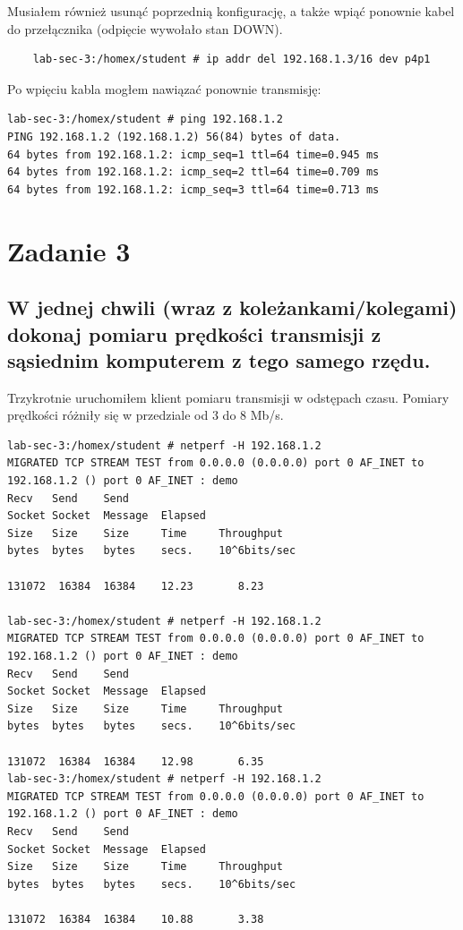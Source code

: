 \documentclass[polish, a4paper]{article}
\begin{document}
Musiałem również usunąć poprzednią konfigurację, a także wpiąć ponownie kabel do przełącznika (odpięcie wywołało stan DOWN).
\begin{verbatim}
    lab-sec-3:/homex/student # ip addr del 192.168.1.3/16 dev p4p1
\end{verbatim}

Po wpięciu kabla mogłem nawiązać ponownie transmisję:

\begin{verbatim}
lab-sec-3:/homex/student # ping 192.168.1.2
PING 192.168.1.2 (192.168.1.2) 56(84) bytes of data.
64 bytes from 192.168.1.2: icmp_seq=1 ttl=64 time=0.945 ms
64 bytes from 192.168.1.2: icmp_seq=2 ttl=64 time=0.709 ms
64 bytes from 192.168.1.2: icmp_seq=3 ttl=64 time=0.713 ms
\end{verbatim}


\section{Zadanie 3}
\subsection{W jednej chwili (wraz z koleżankami/kolegami) dokonaj
pomiaru prędkości transmisji z sąsiednim komputerem z tego
samego rzędu.}

Trzykrotnie uruchomiłem klient pomiaru transmisji w odstępach czasu. Pomiary prędkości różniły się w przedziale od 3 do 8 Mb/s.  

\begin{verbatim}
lab-sec-3:/homex/student # netperf -H 192.168.1.2
MIGRATED TCP STREAM TEST from 0.0.0.0 (0.0.0.0) port 0 AF_INET to 192.168.1.2 () port 0 AF_INET : demo
Recv   Send    Send                          
Socket Socket  Message  Elapsed              
Size   Size    Size     Time     Throughput  
bytes  bytes   bytes    secs.    10^6bits/sec  

131072  16384  16384    12.23       8.23   

lab-sec-3:/homex/student # netperf -H 192.168.1.2
MIGRATED TCP STREAM TEST from 0.0.0.0 (0.0.0.0) port 0 AF_INET to 192.168.1.2 () port 0 AF_INET : demo
Recv   Send    Send                          
Socket Socket  Message  Elapsed              
Size   Size    Size     Time     Throughput  
bytes  bytes   bytes    secs.    10^6bits/sec  

131072  16384  16384    12.98       6.35   
lab-sec-3:/homex/student # netperf -H 192.168.1.2
MIGRATED TCP STREAM TEST from 0.0.0.0 (0.0.0.0) port 0 AF_INET to 192.168.1.2 () port 0 AF_INET : demo
Recv   Send    Send                          
Socket Socket  Message  Elapsed              
Size   Size    Size     Time     Throughput  
bytes  bytes   bytes    secs.    10^6bits/sec  

131072  16384  16384    10.88       3.38   

\end{verbatim}
\end{document}
